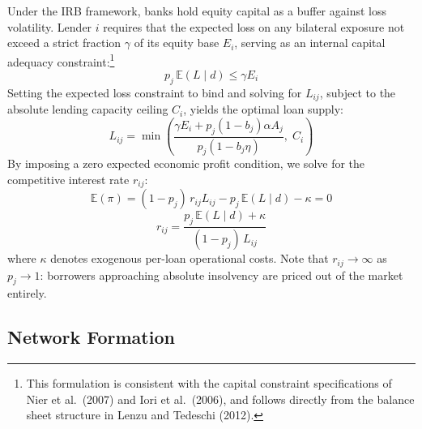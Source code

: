 \documentclass{article}
\begin{document}
Under the IRB framework, banks hold equity capital as a buffer against loss volatility.
Lender $i$ requires that the expected loss on any bilateral exposure not exceed a strict
fraction $\gamma$ of its equity base $E_i$, serving as an internal capital adequacy
constraint:\footnote{This formulation is consistent with the capital constraint
specifications of Nier et al.\ (2007) and Iori et al.\ (2006), and follows directly from
the balance sheet structure in Lenzu and Tedeschi (2012).}
\begin{equation}
    p_{j}\,\mathbb{E}(L \mid d) \leq \gamma E_{i}
\end{equation}
Setting the expected loss constraint to bind and solving for $L_{ij}$, subject to the
absolute lending capacity ceiling $C_i$, yields the optimal loan supply:
\begin{equation}
\boxed{
    L_{ij} = \min\!\left(
        \frac{\gamma E_{i} + p_{j}(1 - b_{j})\alpha A_{j}}{p_{j}(1 - b_{j}\eta)},\;
        C_{i}
    \right)
}
\end{equation}
By imposing a zero expected economic profit condition, we solve for the competitive
interest rate $r_{ij}$:
\begin{equation}
    \mathbb{E}(\pi) = (1 - p_{j})\,r_{ij}L_{ij} - p_{j}\,\mathbb{E}(L \mid d) - \kappa = 0
\end{equation}
\begin{equation}
\boxed{
    r_{ij} = \frac{p_{j}\,\mathbb{E}(L \mid d) + \kappa}{(1 - p_{j})\,L_{ij}}
}
\end{equation}
where $\kappa$ denotes exogenous per-loan operational costs. Note that $r_{ij} \to \infty$
as $p_j \to 1$: borrowers approaching absolute insolvency are priced out of the
market entirely.
\subsection{Network Formation}
\end{document}
